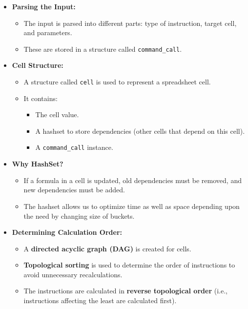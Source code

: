 \documentclass{article}
\begin{document}
\begin{itemize}
    \item \textbf{Parsing the Input:}
    \begin{itemize}
        \item The input is parsed into different parts: type of instruction, target cell, and parameters.
        \item These are stored in a structure called \texttt{command\_call}.
    \end{itemize}
    
    \item \textbf{Cell Structure:}
    \begin{itemize}
        \item A structure called \texttt{cell} is used to represent a spreadsheet cell.
        \item It contains:
        \begin{itemize}
            \item The cell value.
            \item A hashset to store dependencies (other cells that depend on this cell).
            \item A \texttt{command\_call} instance.
        \end{itemize}
    \end{itemize}
    
    \item \textbf{Why HashSet?}
    \begin{itemize}
        \item If a formula in a cell is updated, old dependencies must be removed, and new dependencies must be added.
        \item The hashset allows us to optimize time as well as space depending upon the need by changing size of buckets.
    \end{itemize}
    
    \item \textbf{Determining Calculation Order:}
    \begin{itemize}
        \item A \textbf{directed acyclic graph (DAG)} is created for cells.
        \item \textbf{Topological sorting} is used to determine the order of instructions to avoid unnecessary recalculations.
        \item The instructions are calculated in \textbf{reverse topological order} (i.e., instructions affecting the least are calculated first).
    \end{itemize}
    

\end{itemize}
\end{document}

